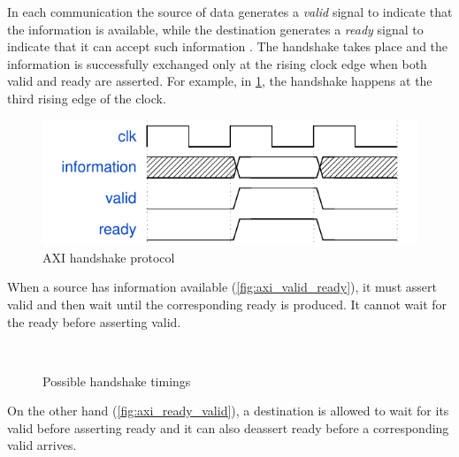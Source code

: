 In each communication the source of data generates a \emph{valid} signal to indicate that the information is available, while the destination generates a \emph{ready} signal to indicate that it can accept such information \cite[p.~A3-41]{axi}. The handshake takes place and the information is successfully exchanged only at the rising clock edge when both valid and ready are asserted. For example, in \cref{fig:axi}, the handshake happens at the third rising edge of the clock.
\begin{figure}[hbt]
  \centering
  \includegraphics{img/axi.pdf}
  \caption{AXI handshake protocol}
  \label{fig:axi}
\end{figure}

When a source has information available (\cref{fig:axi_valid_ready}), it must assert valid and then wait until the corresponding ready is produced. It cannot wait for the ready before asserting valid.
\begin{figure}[hbt]
  \centering
   \\
  \caption{Possible handshake timings}
  \label{fig:axi_timings}
\end{figure}
On the other hand (\cref{fig:axi_ready_valid}), a destination is allowed to wait for its valid before asserting ready and it can also deassert ready before a corresponding valid arrives.

